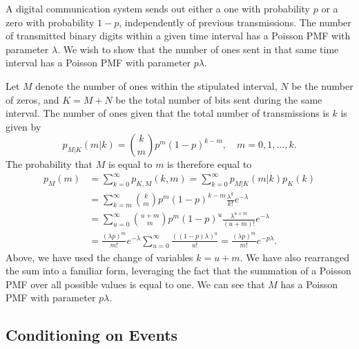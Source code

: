 \begin{example}
A digital communication system sends out either a one with probability $p$ or a zero with probability $1 - p$, independently of previous transmissions.
The number of transmitted binary digits within a given time interval has a Poisson PMF with parameter $\lambda$.
We wish to show that the number of ones sent in that same time interval has a Poisson PMF with parameter $p \lambda$.

Let $M$ denote the number of ones within the stipulated interval, $N$ be the number of zeros, and $K = M + N$ be the total number of bits sent during the same interval.
The number of ones given that the total number of transmissions is $k$ is given by
\begin{equation*}
p_{M|K} (m | k) = \binom{k}{m} p^m (1-p)^{k - m},
\quad m = 0, 1, \ldots, k.
\end{equation*}
The probability that $M$ is equal to $m$ is therefore equal to
\begin{equation*}
\begin{split}
p_{M} (m) &= \sum_{k = 0}^{\infty} p_{K,M} (k, m)
= \sum_{k = 0}^{\infty} p_{M|K} (m | k) p_K(k) \\
&= \sum_{k = m}^{\infty} \binom{k}{m} p^m (1-p)^{k - m}
\frac{\lambda^{k}}{k !} e^{-\lambda} \\
&= \sum_{u = 0}^{\infty} \binom{u+m}{m} p^m (1-p)^{u}
\frac{\lambda^{u+m}}{(u+m)!} e^{-\lambda} \\
&= \frac{(\lambda p)^m}{m!} e^{-\lambda}
\sum_{u = 0}^{\infty} \frac{( (1-p) \lambda)^{u}}{u!}
= \frac{(\lambda p)^m}{m!} e^{-p \lambda} .
\end{split}
\end{equation*}
Above, we have used the change of variables $k = u+m$.
We have also rearranged the sum into a familiar form, leveraging the fact that the summation of a Poisson PMF over all possible values is equal to one.
We can see that $M$ has a Poisson PMF with parameter $p \lambda$.
\end{example}


\subsection{Conditioning on Events}

